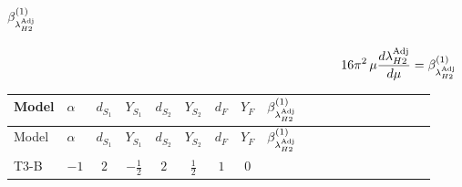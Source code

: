 \documentclass{article}
\begin{document}
\begin{landscape}
\section*{$\beta_{\lambda_{H2}^{\rm Adj}}^{(1)}$}
\[16\pi^2\,\mu\frac{d \lambda_{H2}^{\rm Adj}}{d\mu}=\beta_{\lambda_{H2}^{\rm Adj}}^{(1)}\]
\tiny
\begin{longtable}{@{}llcccccc >{\raggedright\arraybackslash}p{0.54\linewidth}@{}}
\toprule
Model & $\alpha$ & $d_{S_1}$ & $Y_{S_1}$ & $d_{S_2}$ & $Y_{S_2}$ & $d_F$ & $Y_F$ & $\beta_{\lambda_{H2}^{\rm Adj}}^{(1)}$ \\
\midrule
\endfirsthead
\toprule
Model & $\alpha$ & $d_{S_1}$ & $Y_{S_1}$ & $d_{S_2}$ & $Y_{S_2}$ & $d_F$ & $Y_F$ & $\beta_{\lambda_{H2}^{\rm Adj}}^{(1)}$ \\
\midrule
\endhead
T3-B & $-1$ & $2$ & $-\frac{1}{2}$ & $2$ & $\frac{1}{2}$ & $1$ & $0$ & \scriptsize\adjustbox{max width=\linewidth}{$\begin{gathered} {\lambda_{H2}^{\rm Adj}} (2 \operatorname{Tr}\!\left({y_2}\,\left({y_2}\right)^{\dagger}\right)+6 \operatorname{Tr}\!\left({Y_d}\,\left({Y_d}\right)^{\dagger}\right)+2 \operatorname{Tr}\!\left({Y_e}\,\left({Y_e}\right)^{\dagger}\right)+6 \operatorname{Tr}\!\left({Y_u}\,\left({Y_u}\right)^{\dagger}\right)) \\ +{\lambda_{H H^\dagger S_1^\dagger S_2^\dagger}^{\rm Cross}} (-2 \operatorname{Tr}\!\left({y_1}\,\left({y_2}\right)^{\dagger}\right)-4 (2 \left({\lambda_{H H^\dagger S_1^\dagger S_2^\dagger}^{\rm Cross}}\right)^{*}+\left({\lambda_{S_1^\dagger S_2 S_2^{\dagger 2}}}\right)^{*})) \\ -2 \left({\lambda_{H H^\dagger S_1^\dagger S_2^\dagger}^{\rm Cross}}\right)^{*} \operatorname{Tr}\!\left({y_2}\,\left({y_1}\right)^{\dagger}\right) \\ +8 \operatorname{Tr}\!\left({y_2}\,\left({y_2}\right)^{\dagger}\,{Y_e}\,\left({Y_e}\right)^{\dagger}\right) \\ -4 {\lambda_{S_1^\dagger S_2 S_2^{\dagger 2}}} \left({\lambda_{H H^\dagger S_1^\dagger S_2^\dagger}^{\rm Cross}}\right)^{*} \\ +64 {\lambda_{H^\dagger H^\dagger S_2 S_2}} \left({\lambda_{H^\dagger H^\dagger S_2 S_2}}\right)^{*} \\ +16 {\lambda_{T3}} \left({\lambda_{T3}}\right)^{*} \\ +{g_Y}^2 \left(6 {g_2}^2-3 {\lambda_{H2}^{\rm Adj}}\right) \\ -9 {g_2}^2 {\lambda_{H2}^{\rm Adj}} \\ +{\lambda_{12}^{\rm Adj}} {\lambda_{H1}^{\rm Adj}} \\ +2 {\lambda_H} {\lambda_{H2}^{\rm Adj}} \\ +8 {\lambda_{H2}} {\lambda_{H2}^{\rm Adj}} \\ +2 {\lambda_{H2}^{\rm Adj}} {\lambda_{S_2}}\end{gathered}$} \\

\end{longtable}
\end{landscape}
\end{document}
